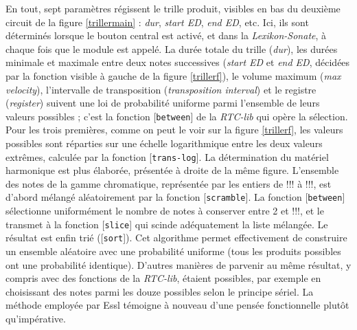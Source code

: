 \documentclass[a4paper,12pt]{article}
\newcommand{\patch}[1]{[\texttt{#1}]}
\begin{document}
En tout, sept paramètres régissent le trille produit, visibles en bas du deuxième circuit de la figure \ref{trillermain} : \emph{dur}, \emph{start ED}, \emph{end ED}, etc. Ici, ils sont déterminés lorsque le bouton central est activé, et dans la \emph{Lexikon-Sonate}, à chaque fois que le module est appelé. La durée totale du trille (\emph{dur}), les durées minimale et maximale entre deux notes successives (\emph{start ED} et \emph{end ED}, décidées par la fonction visible à gauche de la figure \ref{trillerf}), le volume maximum (\emph{max velocity}), l'intervalle de transposition (\emph{transposition interval}) et le registre (\emph{register}) suivent une loi de probabilité uniforme parmi l'ensemble de leurs valeurs possibles ; c'est la fonction \patch{between} de la \emph{RTC-lib} qui opère la sélection. Pour les trois premières, comme on peut le voir sur la figure \ref{trillerf}, les valeurs possibles sont réparties sur une échelle logarithmique entre les deux valeurs extrêmes, calculée par la fonction \patch{trans-log}. La détermination du matériel harmonique est plus élaborée, présentée à droite de la même figure. L'ensemble des notes de la gamme chromatique, représentée par les entiers de !!! à !!!, est d'abord mélangé aléatoirement par la fonction \patch{scramble}. La fonction \patch{between} sélectionne uniformément le nombre de notes à conserver entre 2 et !!!, et le transmet à la fonction \patch{slice} qui scinde adéquatement la liste mélangée. Le résultat est enfin trié (\patch{sort}). Cet algorithme permet effectivement de construire un ensemble aléatoire avec une probabilité uniforme (tous les produits possibles ont une probabilité identique). D'autres manières de parvenir au même résultat, y compris avec des fonctions de la \emph{RTC-lib}, étaient possibles, par exemple en choisissant des notes parmi les douze possibles selon le principe sériel. La méthode employée par Essl témoigne à nouveau d'une pensée fonctionnelle plutôt qu'impérative.
\end{document}
